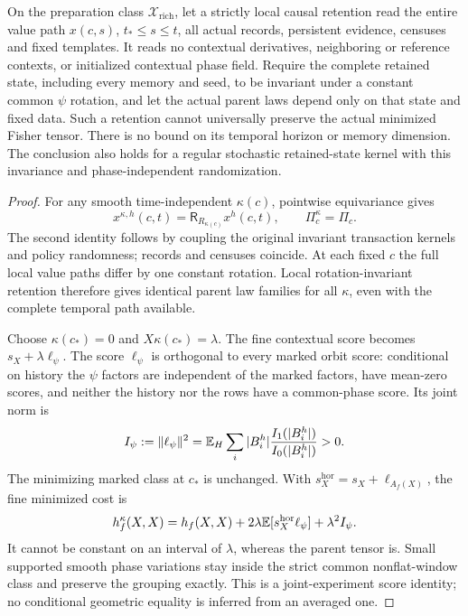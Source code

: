 On the preparation class $\mathcal X_{\mathrm{rich}}$, let a strictly local causal retention read the entire value path $x(c,s)$, $t_*\le s\le t$, all actual records, persistent evidence, censuses and fixed templates. It reads no contextual derivatives, neighboring or reference contexts, or initialized contextual phase field. Require the complete retained state, including every memory and seed, to be invariant under a constant common $\psi$ rotation, and let the actual parent laws depend only on that state and fixed data. Such a retention cannot universally preserve the actual minimized Fisher tensor. There is no bound on its temporal horizon or memory dimension. The conclusion also holds for a regular stochastic retained-state kernel with this invariance and phase-independent randomization.
\begin{proof}
For any smooth time-independent $\kappa(c)$, pointwise equivariance gives
\begin{equation}
 x^{\kappa,h}(c,t)=\mathsf R_{R_{\kappa(c)}}x^h(c,t),\qquad
 \Pi_c^\kappa=\Pi_c.
 \label{lp:phase-field-history}
\end{equation}
The second identity follows by coupling the original invariant transaction kernels and policy randomness; records and censuses coincide. At each fixed $c$ the full local value paths differ by one constant rotation. Local rotation-invariant retention therefore gives identical parent law families for all $\kappa$, even with the complete temporal path available.

Choose $\kappa(c_*)=0$ and $X\kappa(c_*)=\lambda$. The fine contextual score becomes $s_X+\lambda\ell_\psi$. The score $\ell_\psi$ is orthogonal to every marked orbit score: conditional on history the $\psi$ factors are independent of the marked factors, have mean-zero scores, and neither the history nor the rows have a common-phase score. Its joint norm is
\begin{equation}
 I_\psi:=\|\ell_\psi\|^2
 =\mathbb E_H\sum_i|B_i^h|\frac{I_1(|B_i^h|)}{I_0(|B_i^h|)}>0.
 \label{lp:physical-phase-inertia}
\end{equation}
The minimizing marked class at $c_*$ is unchanged. With $s_X^{\mathrm{hor}}=s_X+\ell_{A_f(X)}$, the fine minimized cost is
\begin{equation}
 h_f^\kappa(X,X)=h_f(X,X)
 +2\lambda\mathbb E[s_X^{\mathrm{hor}}\ell_\psi]
 +\lambda^2I_\psi.
 \label{lp:path-memory-polynomial}
\end{equation}
It cannot be constant on an interval of $\lambda$, whereas the parent tensor is. Small supported smooth phase variations stay inside the strict common nonflat-window class and preserve the grouping exactly. This is a joint-experiment score identity; no conditional geometric equality is inferred from an averaged one.
\end{proof}

